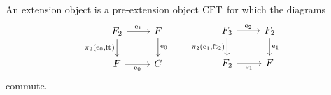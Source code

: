 \begin{defn} 
An extension object is a pre-extension object $\mathrm{CFT}$ for which 
the diagrams
\begin{equation*}
\begin{tikzcd}
\stesysf_2 
  \ar{d}[swap]{\pullbackpr{2}{\ectxext}{\eft}} 
  \ar{r}{\efamext} 
  & 
\stesysf 
  \ar{d}{\ectxext}
  \\
\stesysf 
  \ar{r}[swap]{\ectxext} 
  & 
\stesysc
\end{tikzcd}
\qquad
\begin{tikzcd}
\stesysf_3
  \ar{d}[swap]{\pullbackpr{2}{\efamext}{\eft[2]}}
  \ar{r}{\eext{2}}
  & 
\stesysf_2 
  \ar{d}{\efamext} 
  \\
\stesysf_2 
  \ar{r}[swap]{\efamext} 
  &
\stesysf
\end{tikzcd}
\end{equation*}
commute.
\end{defn}

\begin{comment}
\begin{lem}
There exists an isomorphism $\alpha$ such that the triangle
\begin{equation*}
\begin{tikzcd}[column sep=tiny]
\pullback{\stesysf}{\stesysf_2}{\ectxext}{\eft\circ\eft[2]}
  \ar[dotted]{rr}{\alpha}
  \ar{dr}[swap]{\pullback{\catid{\stesysf}}{\efamext}{\ectxext}{\eft}}
  &
  &
\stesysf_3
  \ar{dl}{\eext{2}}
  \\
& \stesysf_2
\end{tikzcd}
\end{equation*}
commutes
\end{lem}

\begin{proof}
There is a unique morphism $\alpha:
\pullback{\stesysf}{\stesysf_2}{\ectxext}{\eft\circ\eft[2]}\to\stesysf_3$
rendering the diagram
\begin{equation*}
\begin{tikzcd}[column sep=large]
\pullback{\stesysf}{\stesysf_2}{\ectxext}{\eft\circ\eft[2]}
  \ar[bend left=10,yshift=.5ex]{drrr}{\pullbackpr{2}{\ectxext}{\eft}\circ\pullbackpr{2}{\ectxext}{\eft\circ\eft[2]}}
  \ar[bend right=10]{ddr}[swap]{\pullback{\catid{\stesysf}}{\eft[2]}{\ectxext}{\eft}}
  \ar[dotted]{dr}{\alpha}
  \\
& \stesysf_3
  \ar{r}{\pullbackpr{2}{\efamext}{\eft[2]}}
  \ar{d}{\eft[3]}
  &
\stesysf_2
  \ar{d}[swap]{\eft[2]}
  \ar{r}[swap]{\pullbackpr{2}{\ectxext}{\eft}}
  &
\stesysf
  \ar{d}{\eft}
  \\
{} & \stesysf_2
  \ar{r}[swap]{\efamext}
  &
\stesysf
  \ar{r}[swap]{\ectxext}
  &
\stesysc
\end{tikzcd}
\end{equation*}
\end{proof}
\end{comment}

